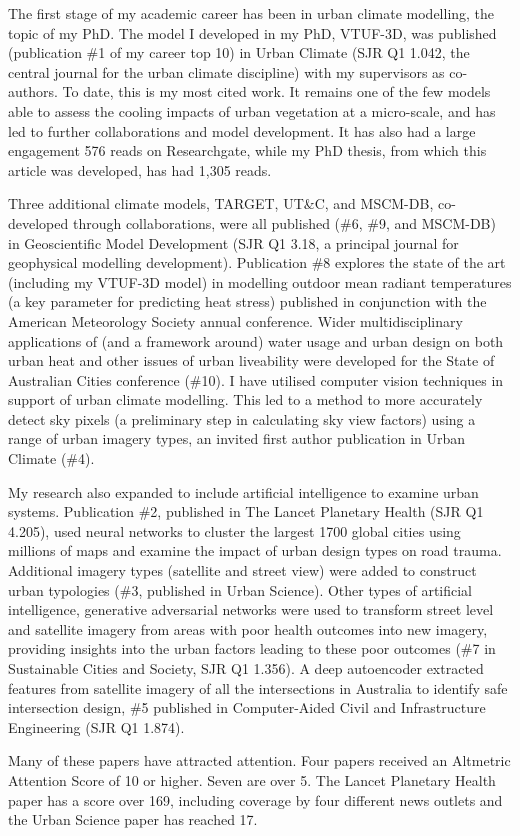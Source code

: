 The first stage of my academic career has been in urban climate modelling, the topic of my PhD. The model I developed in my PhD, VTUF-3D, was published (publication \#1 of my career top 10) in Urban Climate (SJR Q1 1.042, the central journal for the urban climate discipline) with my supervisors as co-authors. To date, this is my most cited work. It remains one of the few models able to assess the cooling impacts of urban vegetation at a micro-scale, and has led to further collaborations and model development. It has also had a large engagement 576 reads on Researchgate, while my PhD thesis, from which this article was developed, has had 1,305 reads. 

Three additional climate models, TARGET, UT\&C, and MSCM-DB, co-developed through collaborations, were all published (\#6, \#9, and MSCM-DB) in Geoscientific Model Development (SJR Q1 3.18, a principal journal for geophysical modelling development). Publication \#8 explores the state of the art (including my VTUF-3D model) in modelling outdoor mean radiant temperatures (a key parameter for predicting heat stress) published in conjunction with the American Meteorology Society annual conference. Wider multidisciplinary applications of (and a framework around) water usage and urban design on both urban heat and other issues of urban liveability were developed for the State of Australian Cities conference (\#10). I have utilised computer vision techniques in support of urban climate modelling. This led to a method to more accurately detect sky pixels (a preliminary step in calculating sky view factors) using a range of urban imagery types, an invited first author publication in Urban Climate (\#4). 

My research also expanded to include artificial intelligence to examine urban systems. Publication \#2, published in The Lancet Planetary Health (SJR Q1 4.205), used neural networks to cluster the largest 1700 global cities using millions of maps and examine the impact of urban design types on road trauma. Additional imagery types (satellite and street view) were added to construct urban typologies (\#3, published in Urban Science). Other types of artificial intelligence, generative adversarial networks were used to transform street level and satellite imagery from areas with poor health outcomes into new imagery, providing insights into the urban factors leading to these poor outcomes (\#7 in Sustainable Cities and Society, SJR Q1 1.356). A deep autoencoder extracted features from satellite imagery of all the intersections in Australia to identify safe intersection design, \#5 published in Computer-Aided Civil and Infrastructure Engineering (SJR Q1 1.874).

Many of these papers have attracted attention. Four papers received an Altmetric Attention Score of 10 or higher. Seven are over 5. The Lancet Planetary Health paper has a score over 169, including coverage by four different news outlets and the Urban Science paper has reached 17.


%
